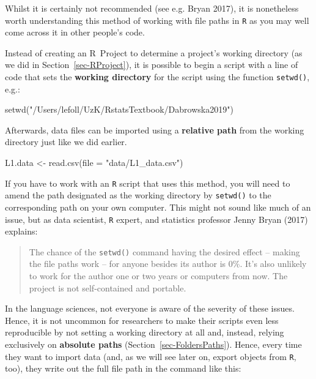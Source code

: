 \documentclass[
  letterpaper,
  DIV=11,
  numbers=noendperiod]{scrreprt}
\newenvironment{Shaded}{\begin{snugshade}}{\end{snugshade}}
\newcommand{\AttributeTok}[1]{\textcolor[rgb]{0.40,0.45,0.13}{#1}}
\newcommand{\FunctionTok}[1]{\textcolor[rgb]{0.28,0.35,0.67}{#1}}
\newcommand{\NormalTok}[1]{\textcolor[rgb]{0.00,0.23,0.31}{#1}}
\newcommand{\OtherTok}[1]{\textcolor[rgb]{0.00,0.23,0.31}{#1}}
\newcommand{\StringTok}[1]{\textcolor[rgb]{0.13,0.47,0.30}{#1}}
\newcounter{none} %
\begin{document}
Whilst it is certainly not recommended (see e.g. Bryan 2017), it is
nonetheless worth understanding this method of working with file paths
in \texttt{R} as you may well come across it in other people's code.

Instead of creating an R~Project to determine a project's working
directory (as we did in Section~\ref{sec-RProject}), it is possible to
begin a script with a line of code that sets the \textbf{working
directory} for the script using the function \texttt{setwd()}, e.g.:

\begin{Shaded}
\begin{Highlighting}[]
\FunctionTok{setwd}\NormalTok{(}\StringTok{"/Users/lefoll/UzK/RstatsTextbook/Dabrowska2019"}\NormalTok{)}
\end{Highlighting}
\end{Shaded}

Afterwards, data files can be imported using a \textbf{relative path}
from the working directory just like we did earlier.

\begin{Shaded}
\begin{Highlighting}[]
\NormalTok{L1.data }\OtherTok{\textless{}{-}} \FunctionTok{read.csv}\NormalTok{(}\AttributeTok{file =} \StringTok{"data/L1\_data.csv"}\NormalTok{)}
\end{Highlighting}
\end{Shaded}

If you have to work with an \texttt{R} script that uses this method, you
will need to amend the path designated as the working directory by
\texttt{setwd()} to the corresponding path on your own computer. This
might not sound like much of an issue, but as data scientist, \texttt{R}
expert, and statistics professor Jenny Bryan (2017) explains:

\begin{quote}
The chance of the \texttt{setwd()} command having the desired effect --
making the file paths work -- for anyone besides its author is 0\%. It's
also unlikely to work for the author one or two years or computers from
now. The project is not self-contained and portable.
\end{quote}

In the language sciences, not everyone is aware of the severity of these
issues. Hence, it is not uncommon for researchers to make their scripts
even less reproducible by not setting a working directory at all and,
instead, relying exclusively on \textbf{absolute paths}
(Section~\ref{sec-FoldersPaths}). Hence, every time they want to import
data (and, as we will see later on, export objects from \texttt{R},
too), they write out the full file path in the command like this:
\end{document}
